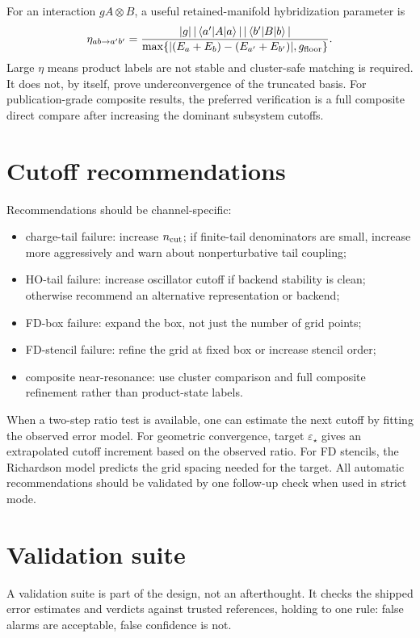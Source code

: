 \documentclass[11pt,a4paper]{article}
\newcommand{\me}[3]{\left\langle#1\middle|#2\middle|#3\right\rangle}
\newcommand{\ncut}{n_{\rm cut}}
\newcommand{\eps}{\varepsilon}
\newcommand{\gfloor}{g_{\rm floor}}
\begin{document}
For an interaction $g A\otimes B$, a useful retained-manifold hybridization parameter is
\begin{equation}
  \eta_{ab\to a'b'}=
  \frac{|g|\,|\me{a'}{A}{a}|\,|\me{b'}{B}{b}|}
       {\max\{|(E_a+E_b)-(E_{a'}+E_{b'})|,\gfloor\}}.
\end{equation}
Large $\eta$ means product labels are not stable and cluster-safe matching is required.  It does not, by itself, prove underconvergence of the truncated basis.  For publication-grade composite results, the preferred verification is a full composite direct compare after increasing the dominant subsystem cutoffs.

\section{Cutoff recommendations}
\label{sec:recommendations}

Recommendations should be channel-specific:
\begin{itemize}
\item charge-tail failure: increase $\ncut$; if finite-tail denominators are small, increase more aggressively and warn about nonperturbative tail coupling;
\item HO-tail failure: increase oscillator cutoff if backend stability is clean; otherwise recommend an alternative representation or backend;
\item FD-box failure: expand the box, not just the number of grid points;
\item FD-stencil failure: refine the grid at fixed box or increase stencil order;
\item composite near-resonance: use cluster comparison and full composite refinement rather than product-state labels.
\end{itemize}

When a two-step ratio test is available, one can estimate the next cutoff by fitting the observed error model.  For geometric convergence, target $\eps_\star$ gives an extrapolated cutoff increment based on the observed ratio.  For FD stencils, the Richardson model predicts the grid spacing needed for the target.  All automatic recommendations should be validated by one follow-up check when used in strict mode.

\section{Validation suite}

A validation suite is part of the design, not an afterthought.  It checks the shipped error estimates and verdicts against trusted references, holding to one rule: false alarms are acceptable, false confidence is not.
\end{document}

